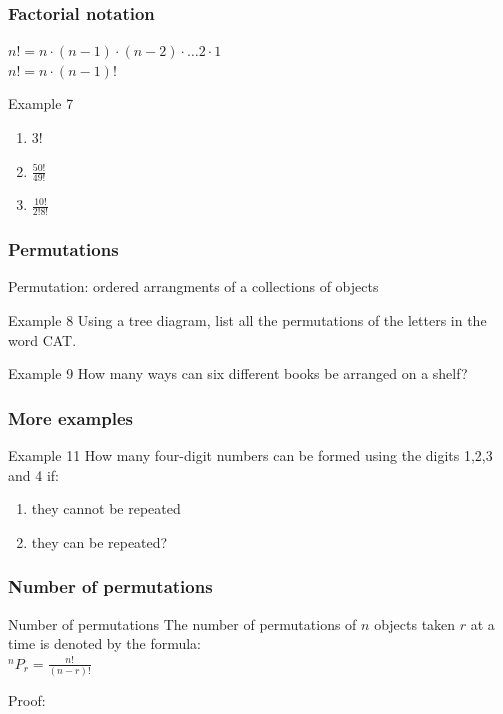 \documentclass[
	11pt, %
]{beamer}
\begin{document}
\begin{frame}
    \frametitle{Factorial notation}
    $n! = n \cdot (n-1) \cdot (n-2) \cdot \dots 2 \cdot 1$\\
    $n! = n \cdot (n-1)!$
    \begin{block}{Example 7}
        \begin{enumerate}
            \item $3!$
            \item $\frac{50!}{49!}$
            \item $\frac{10!}{2!8!}$
        \end{enumerate}
    \end{block}
\end{frame}

\begin{frame}[t]
    \frametitle{Permutations}
    Permutation: ordered arrangments of a collections of objects
    \begin{block}{Example 8}
        Using a tree diagram, list all the permutations of the letters in the word CAT.
    \end{block}
    \begin{block}{Example 9}
        How many ways can six different books be arranged on a shelf?
    \end{block}
\end{frame}

\begin{frame}[t]
    \frametitle{More examples}
    \begin{block}{Example 11}
        How many four-digit numbers can be formed using the digits 1,2,3 and 4 if:
        \begin{enumerate}
            \item they cannot be repeated
            \item they can be repeated?
        \end{enumerate}
    \end{block}
\end{frame}

\begin{frame}[t]
    \frametitle{Number of permutations}
    \begin{block}{Number of permutations}
        The number of permutations of $n$ objects taken $r$ at a time is denoted by the formula:\\
        $^nP_r = \frac{n!}{(n-r)!}$
    \end{block}
    Proof:
\end{frame}
\end{document}
